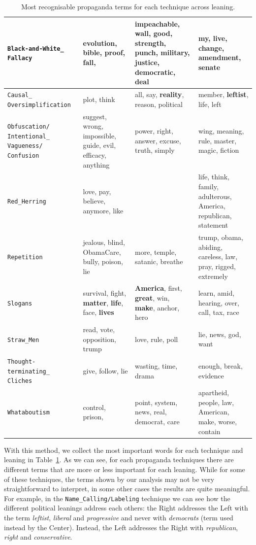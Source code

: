 \begin{table}[!htbp]
{\begin{tabular}{p{}|p{}|p{}|p{}}
         \hline
         \texttt{Black-and-White\_ Fallacy} & evolution, bible, proof, fall,  & impeachable, wall, good, strength, punch, military, justice, democratic, deal & my, live, change, amendment, senate \\
         \hline
         \texttt{Causal\_ Oversimplification} & plot, think & all, say, \textbf{reality}, reason, political & member, \textbf{leftist}, life, left  \\
         \hline
         \texttt{Obfuscation/ Intentional\_ Vagueness/ Confusion} & suggest, wrong, impossible, guide, evil, efficacy, anything & power, right, answer, excuse, truth, simply  & wing, meaning, rule, master, magic, fiction \\
         \hline
         \texttt{Red\_Herring} & love, pay, believe, anymore, like & & life, think, family, adulterous, America, republican, statement  \\
         \hline
         \texttt{Repetition} & jealous, blind, ObamaCare, bully, poison, lie  & more, temple, satanic, breathe & trump, obama, abiding, careless, law, pray, rigged, extremely  \\
         \hline
         \texttt{Slogans} & survival, fight, \textbf{matter}, \textbf{life}, face, \textbf{lives} & \textbf{America}, first, \textbf{great}, win, \textbf{make}, anchor, hero  & learn, amid, hearing, over, call, tax, race  \\
         \hline
         \texttt{Straw\_Men} & read, vote, opposition, trump & love, rule, poll & lie, news, god, want \\
         \hline
         \texttt{Thought-terminating\_ Cliches} & give, follow, lie  & wasting, time, drama & enough, break, evidence \\
         \hline
         \texttt{Whataboutism} & control, prison, & point, system, news, real, democrat, care  & apartheid, people, law, American, make, worse, contain \\
    \end{tabular}
}
    \caption{Most recognisable propaganda terms for each technique across leaning.}
    \label{tab:prop_words_by_technique_and_leaning}
\end{table}

With this method, we collect the most important words for each technique and leaning in Table~\ref{tab:prop_words_by_technique_and_leaning}.
%
As we can see, for each propaganda techniques there are different terms that are more or less important for each leaning.
While for some of these techniques, the terms shown by our analysis may not be very straightforward to interpret,
in some other cases the results are quite meaningful.
For example, in the \texttt{Name\_Calling/Labeling} technique we can see how the different political leanings address each others: the Right addresses the Left with the term \emph{leftist}, \emph{liberal} and \emph{progressive} and never with \emph{democrats} (term used instead by the Center). Instead, the Left addresses the Right with \emph{republican}, \emph{right} and \emph{conservative}.

